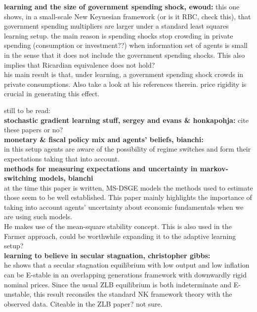 \documentclass[12pt,reqno]{article}
\numberwithin{equation}{section}
\begin{document}
\textbf{ learning and the size of government spending shock, ewoud: } this one shows, in a small-scale New Keynesian framework (or is it RBC, check this), that government spending multipliers are larger under a standard least squares learning setup. the main reason is spending shocks stop crowding in private spending (consumption or investment??) when information set of agents is small in the sense that it does not include the government spending shocks. This also implies that Ricardian equivalence does not hold? \\

his main result is that, under learning, a government spending shock crowds in private consumptions. Also take a look at his references therein. price rigidity is crucial in generating this effect. 

still to be read: \\

\textbf{stochastic gradient learning stuff, sergey and evans \& honkapohja:} cite these papers or no? \\

\textbf{monetary \& fiscal policy mix and agents' beliefs, bianchi: } \\
in this setup agents are aware of the possibility of regime switches and form their expectations taking that into account. \\

\textbf{methods for measuring expectations and uncertainty in markov-switching models, bianchi} \\

at the time this paper is written, MS-DSGE models the methods used to estimate those seem to be well established. This paper mainly highlights the importance of taking into account agents' uncertainty about economic fundamentals when we are using such models.\\

He makes use of the mean-square stability concept. This is also used in the Farmer approach, could be worthwhile expanding it to the adaptive learning setup? \\

\textbf{learning to believe in secular stagnation, christopher gibbs: } \\

he shows that a secular stagnation equilibrium with low output and low inflation can be E-stable in an overlapping generations framework with downwardly rigid nominal prices. Since the usual ZLB equilibrium is both indeterminate and E-unstable, this result reconsiles the standard NK framework theory with the observed data. Citeable in the ZLB paper? not sure. \\
\end{document}
